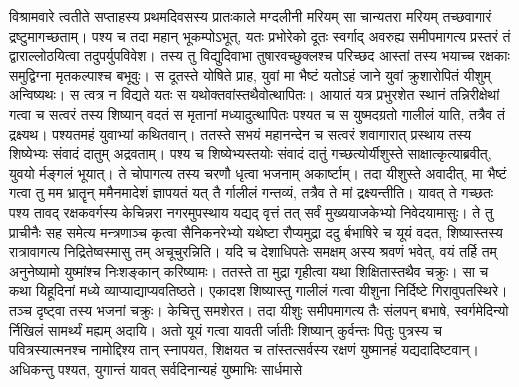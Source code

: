 \adhyAya
{}
\vakya विश्रामवारे त्वतीते सप्ताहस्य प्रथमदिवसस्य प्रातःकाले मग्दलीनी मरियम् सा चान्यतरा मरियम् तच्छवागारं द्रष्टुमागच्छताम्।
\vakya पश्य च तदा महान् भूकम्पोऽभूत्, यतः प्रभोरेको दूतः स्वर्गाद् अवरुह्य समीपमागत्य प्रस्तरं तं द्वाराल्लोठयित्वा तदुपर्युपविवेश।
\vakya तस्य तु विद्युदिवाभा तुषारवच्छुक्लश्च परिच्छद आस्तां
\vakya तस्य भयाच्च रक्षकाः समुद्विग्ना मृतकल्पाश्च बभूवुः।
\vakya स दूतस्ते योषिते प्राह, युवां मा भैष्टं यतोऽहं जाने युवां क्रुशारोपितं यीशुम् अन्विष्यथः।
\vakya स त्वत्र न विद्यते यतः स यथोक्तवांस्तथैवोत्थापितः।
\vakya आयातं यत्र प्रभुरशेत स्थानं तन्निरीक्षेथां गत्वा च सत्वरं तस्य शिष्यान् वदतं स मृतानां मध्यादुत्थापितः पश्यत च स युष्मदग्रतो गालीलं याति, तत्रैव तं द्रक्ष्यथ।
\vakya पश्यतमहं युवाभ्यां कथितवान्। ततस्ते सभयं महानन्देन च सत्वरं शवागारात् प्रस्थाय तस्य शिष्येभ्यः संवादं दातुम् अद्रवताम्।
\vakya पश्य च शिष्येभ्यस्तयोः संवादं दातुं गच्छत्योर्यीशुस्ते साक्षात्कृत्याब्रवीत्, युवयो र्मङ्गलं भूयात्।
\vakya ते चोपागत्य तस्य चरणौ धृत्वा भजनाम् अकार्ष्टाम्। तदा यीशुस्ते अवादीत्, मा भैष्टं गत्वा तु मम भ्रातॄन् ममैनमादेशं ज्ञापयतं यत् तै र्गालीलं गन्तव्यं, तत्रैव ते मां द्रक्ष्यन्तीति।
\vakya यावत् ते गच्छतः पश्य तावद् रक्षकवर्गस्य केचिन्नरा नगरमुपस्थाय यद्यद् वृत्तं तत् सर्वं मुख्ययाजकेभ्यो निवेदयामासुः।
\vakya ते तु प्राचीनैः सह समेत्य मन्त्रणाञ्च कृत्वा सैनिकनरेभ्यो यथेष्टा रौप्यमुद्रा ददु र्बभाषिरे
\vakya च यूयं वदत, शिष्यास्तस्य रात्रावागत्य निद्रितेष्वस्मासु तम् अचूचुरन्निति।
\vakya यदि च देशाधिपतेः समक्षम् अस्य श्रवणं भवेत्, वयं तर्हि तम् अनुनेष्यामो युष्मांश्च निःशङ्कान् करिष्यामः।
\vakya ततस्ते ता मुद्रा गृहीत्वा यथा शिक्षितास्तथैव चक्रुः। सा च कथा यिहूदिनां मध्ये व्याप्याद्याप्यवतिष्ठते।
\vakya एकादश शिष्यास्तु गालीलं गत्वा यीशुना निर्दिष्टे गिरावुपतस्थिरे।
\vakya तञ्च दृष्ट्वा तस्य भजनां चक्रुः। केचित्तु समशेरत।
\vakya तदा यीशुः समीपमागत्य तैः संलपन् बभाषे, स्वर्गमेदिन्यो र्निखिलं सामर्थ्यं मह्यम् अदायि।
\vakya अतो यूयं गत्वा यावती र्जातीः शिष्यान् कुर्वन्तः पितुः पुत्रस्य च पवित्रस्यात्मनश्च नामोद्दिश्य तान् स्नापयत,
\vakya शिक्षयत च तांस्तत्सर्वस्य रक्षणं युष्मानहं यद्यदादिष्टवान्। अधिकन्तु पश्यत, युगान्तं यावत् सर्वदिनान्यहं युष्माभिः सार्धमासे\eoc